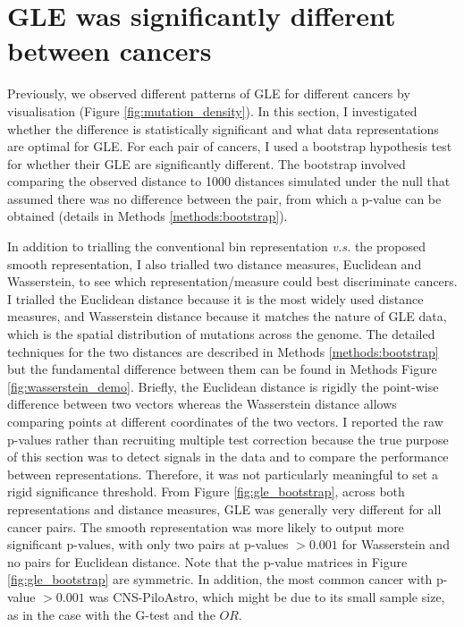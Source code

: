 

\section{GLE was significantly different between cancers}\label{gle:bootstrap}
Previously, we observed different patterns of GLE for different cancers by visualisation (Figure \ref{fig:mutation_density}). In this section, I investigated whether the difference is statistically significant and what data representations are optimal for GLE. For each pair of cancers, I used a bootstrap hypothesis test for whether their GLE are significantly different. The bootstrap involved comparing the observed distance to 1000 distances simulated under the null that assumed there was no difference between the pair, from which a p-value can be obtained (details in Methods \ref{methods:bootstrap}).

In addition to trialling the conventional bin representation \textit{v.s.} the proposed smooth representation, I also trialled two distance measures, Euclidean and Wasserstein, to see which representation/measure could best discriminate cancers. I trialled the Euclidean distance because it is the most widely used distance measures, and Wasserstein distance because it matches the nature of GLE data, which is the spatial distribution of mutations across the genome. The detailed techniques for the two distances are described in Methods \ref{methods:bootstrap} but the fundamental difference between them can be found in Methods Figure \ref{fig:wasserstein_demo}. Briefly, the Euclidean distance is rigidly the point-wise difference between two vectors whereas the Wasserstein distance allows comparing points at different coordinates of the two vectors. I reported the raw p-values rather than recruiting multiple test correction because the true purpose of this section was to detect signals in the data and to compare the performance between representations. Therefore, it was not particularly meaningful to set a rigid significance threshold. From Figure \ref{fig:gle_bootstrap}, across both representations and distance measures, GLE was generally very different for all cancer pairs. The smooth representation was more likely to output more significant p-values, with only two pairs at p-values $>0.001$ for Wasserstein and no pairs for Euclidean distance. Note that the p-value matrices in Figure \ref{fig:gle_bootstrap} are symmetric. In addition, the most common cancer with p-value $>0.001$ was CNS-PiloAstro, which might be due to its small sample size, as in the case with the G-test and the $OR$. 

